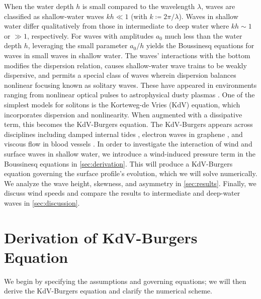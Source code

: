\documentclass{jfm}
\begin{document}
When the water depth $h$ is small compared to the wavelength $\lambda$,
waves are classified as shallow-water waves $kh \ll 1$ (with $k
\coloneqq 2 \pi/\lambda$).
Waves in shallow water differ qualitatively from those in intermediate
to deep water where $kh \sim 1$ or $\gg 1$, respectively.
For waves with amplitudes $a_0$ much less than the water depth $h$,
leveraging the small parameter $a_0/h$ yields the Boussinesq equations
for waves in small waves in shallow water.
The waves' interactions with the bottom modifies the dispersion
relation, causes shallow-water wave trains to be weakly dispersive, and
permits a special class of waves wherein dispersion balances nonlinear
focusing known as solitary waves.
These have appeared in environments ranging from nonlinear optical pulses
\citep[\eg][]{kivshar1993dark} to astrophysical dusty plasmas
\citep[\eg][]{sahu2012nonextensive}.
One of the simplest models for solitons is the Korteweg-de Vries (KdV)
equation, which incorporates dispersion and nonlinearity.
When augmented with a dissipative term, this becomes the KdV-Burgers
equation.
The KdV-Burgers appears across disciplines including damped internal
tides \citep[\eg][]{sandstrom1995dissipation}, electron waves in
graphene \citep[\eg][]{zdyrski2019effects}, and viscous flow in blood
vessels \citep[\eg][]{antar1999weakly}.
In order to investigate the interaction of wind and surface waves in
shallow water, we introduce a wind-induced pressure term in the
Boussinesq equations in \cref{sec:derivation}.
This will produce a KdV-Burgers equation governing the surface profile's
evolution, which we will solve numerically.
We analyze the wave height, skewness, and asymmetry in
\cref{sec:results}.
Finally, we discuss wind speeds and compare the results to intermediate
and deep-water waves in \cref{sec:discussion}.

\section{\label{sec:derivation} Derivation of KdV-Burgers Equation}
We begin by specifying the assumptions and governing equations; we will
then derive the KdV-Burgers equation and clarify the numerical scheme.
\end{document}
